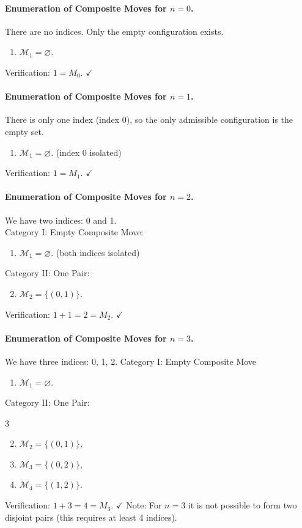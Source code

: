 \documentclass[runningheads]{llncs}
\begin{document}
\paragraph{Enumeration of Composite Moves for $n=0$.} There are no indices. Only the empty configuration exists.
\begin{enumerate}
  \item $\mathcal{M}_1 = \varnothing$.
\end{enumerate}
Verification: $1 = M_0$. \quad $\checkmark$

\paragraph{Enumeration of Composite Moves for $n=1$.} There is only one index (index 0), so the only admissible configuration is the empty set.
\begin{enumerate}
  \item $\mathcal{M}_1 = \varnothing$. \quad (index 0 isolated)
\end{enumerate}
Verification: $1 = M_1$. \quad $\checkmark$

\paragraph{Enumeration of Composite Moves for $n=2$.} We have two indices: 0 and 1. \\
Category I: Empty Composite Move:
\begin{enumerate}
  \item $\mathcal{M}_1 = \varnothing$. \quad (both indices isolated)
\end{enumerate}
Category II: One Pair:
\begin{enumerate}
  \setcounter{enumi}{1}
  \item $\mathcal{M}_2 = \{(0,1)\}$.
\end{enumerate}
Verification: $1 + 1 = 2 = M_2$. \quad $\checkmark$

\paragraph{Enumeration of Composite Moves for $n=3$.} We have three indices: 0, 1, 2.
Category I: Empty Composite Move
\begin{enumerate}
  \item $\mathcal{M}_1 = \varnothing$.
\end{enumerate}
Category II: One Pair:
\begin{multicols}{3}
\begin{enumerate}
  \setcounter{enumi}{1}
  \item $\mathcal{M}_2 = \{(0,1)\}$,
  \item $\mathcal{M}_3 = \{(0,2)\}$,
  \item $\mathcal{M}_4 = \{(1,2)\}$.
\end{enumerate}
\end{multicols}
Verification: $1 + 3 = 4 = M_3$. \quad $\checkmark$
Note: For $n=3$ it is not possible to form two disjoint pairs (this requires at least 4 indices).
\end{document}
